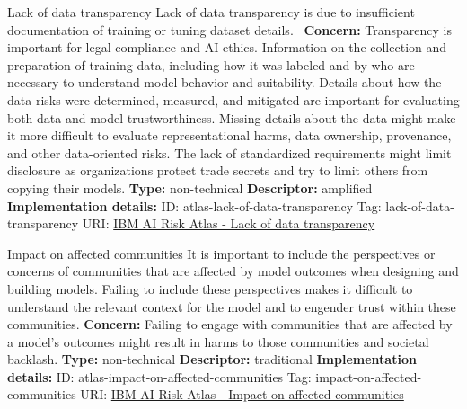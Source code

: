 \documentclass[a4paper,12pt]{article}
\begin{document}
\begin{definitionbox}{Lack of data transparency}
Lack of data transparency is due to insufficient documentation of training or tuning dataset details. \newline\newline
\textbf{Concern: }Transparency is important for legal compliance and AI ethics. Information on the collection and preparation of training data, including how it was labeled and by who are necessary to understand model behavior and suitability. Details about how the data risks were determined, measured, and mitigated are important for evaluating both data and model trustworthiness. Missing details about the data might make it more difficult to evaluate representational harms, data ownership, provenance, and other data-oriented risks. The lack of standardized requirements might limit disclosure as organizations protect trade secrets and try to limit others from copying their models.\newline\newline
\textbf{Type: }non-technical\newline
\textbf{Descriptor: }amplified \newline\newline
\textbf{Implementation details: } \newline
ID: atlas-lack-of-data-transparency \newline
Tag: lack-of-data-transparency \newline
URI:  \href{https://www.ibm.com/docs/en/watsonx/saas?topic=SSYOK8/wsj/ai-risk-atlas/lack-of-data-transparency.html}{IBM AI Risk Atlas - Lack of data transparency}\newline
\end{definitionbox}
\begin{definitionbox}{Impact on affected communities}
It is important to include the perspectives or concerns of communities that are affected by model outcomes when designing and building models. Failing to include these perspectives makes it difficult to understand the relevant context for the model and to engender trust within these communities.\newline\newline
\textbf{Concern: }Failing to engage with communities that are affected by a model's outcomes might result in harms to those communities and societal backlash.\newline\newline
\textbf{Type: }non-technical\newline
\textbf{Descriptor: }traditional \newline\newline
\textbf{Implementation details: } \newline
ID: atlas-impact-on-affected-communities \newline
Tag: impact-on-affected-communities \newline
URI:  \href{https://www.ibm.com/docs/en/watsonx/saas?topic=SSYOK8/wsj/ai-risk-atlas/impact-on-affected-communities.html}{IBM AI Risk Atlas - Impact on affected communities}\newline
\end{definitionbox}
\end{document}
